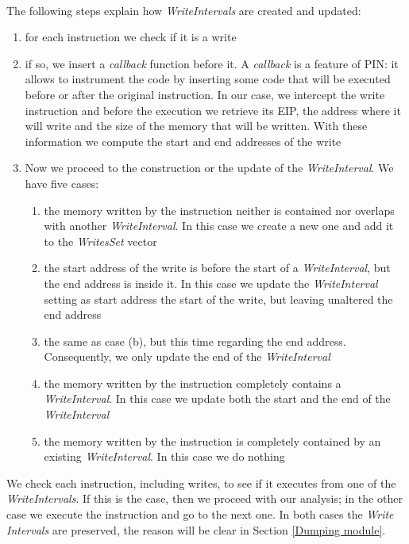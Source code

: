 \paragraph{}
The following steps explain how \textit{WriteIntervals} are created and updated:
\begin{enumerate}
\item for each instruction we check if it is a write
\item if so, we insert a \textit{callback} function before it. A \textit{callback} is a feature of PIN: it allows to instrument the code by inserting some code that will be executed before or after the original instruction. In our case, we intercept the write instruction and before the execution we retrieve its \ac{EIP}, the address where it will write and the size of the memory that will be written. With these information we compute the start and end addresses of the write
\item Now we proceed to the construction or the update of the \textit{WriteInterval}. We have five cases:
	\begin{enumerate}
	\item the memory written by the instruction neither is contained nor overlaps with another \textit{WriteInterval}. In this case we create a new one and add it to the \textit{WritesSet} vector
	\item the start address of the write is before the start of a \textit{WriteInterval}, but the end address is inside it. In this case we update the \textit{WriteInterval} setting as start address the start of the write, but leaving unaltered the end address
	\item the same as case (b), but this time regarding the end address. Consequently, we only update the end of the \textit{WriteInterval} 
	\item the memory written by the instruction completely contains a \textit{WriteInterval}. In this case we update both the start and the end of the \textit{WriteInterval}
	\item the memory written by the instruction is completely contained by an existing \textit{WriteInterval}. In this case we do nothing
	\end{enumerate}
\end{enumerate}
We check each instruction, including writes, to see if it executes from one of the \textit{WriteIntervals}. If this is the case, then we proceed with our analysis; in the other case we execute the instruction and go to the next one. In both cases the \textit{Write Intervals} are preserved, the reason will be clear in Section \ref{Dumping module}.\\

